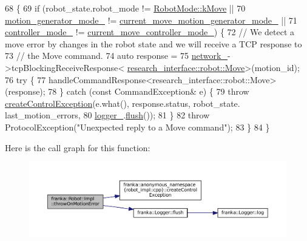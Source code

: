 \begin{DoxyCode}
68                                                                                     \{
69   \textcolor{keywordflow}{if} (robot\_state.robot\_mode != \hyperlink{namespacefranka_adfe059ae23ebbad59e421edaa879651aae54c7412401b5e36c1c254e6fb17a3dd}{RobotMode::kMove} ||
70       \hyperlink{classfranka_1_1Robot_1_1Impl_a209c353b4da1c85d3e633cab161a0d39}{motion\_generator\_mode\_} != 
      \hyperlink{classfranka_1_1Robot_1_1Impl_a2fecb29212c55738e284b2ba8249ad5c}{current\_move\_motion\_generator\_mode\_} ||
71       \hyperlink{classfranka_1_1Robot_1_1Impl_aa435885c35275fc60b8de90832ae24df}{controller\_mode\_} != \hyperlink{classfranka_1_1Robot_1_1Impl_ab5d1a7e855dae2453635da08440c375e}{current\_move\_controller\_mode\_}) \{
72     \textcolor{comment}{// We detect a move error by changes in the robot state and we will receive a TCP response to}
73     \textcolor{comment}{// the Move command.}
74     \textcolor{keyword}{auto} response =
75         \hyperlink{classfranka_1_1Robot_1_1Impl_acecf3b158ccd1c2ed7e76971f1e6a192}{network\_}->tcpBlockingReceiveResponse<
      \hyperlink{structresearch__interface_1_1robot_1_1Move}{research\_interface::robot::Move}>(motion\_id);
76     \textcolor{keywordflow}{try} \{
77       handleCommandResponse<research\_interface::robot::Move>(response);
78     \} \textcolor{keywordflow}{catch} (\textcolor{keyword}{const} CommandException& e) \{
79       \textcolor{keywordflow}{throw} \hyperlink{namespacefranka_1_1anonymous__namespace_02robot__impl_8cpp_03_ad774a35737682bade54336046f9d09b2}{createControlException}(e.what(), response.status, robot\_state.
      last\_motion\_errors,
80                                    \hyperlink{classfranka_1_1Robot_1_1Impl_a404078ee04a4786f61d991b71d2dc1ff}{logger\_}.\hyperlink{classfranka_1_1Logger_a44b15a95e25dabe93f797c1d9651fb6e}{flush}());
81     \}
82     \textcolor{keywordflow}{throw} ProtocolException(\textcolor{stringliteral}{"Unexpected reply to a Move command"});
83   \}
84 \}
\end{DoxyCode}
Here is the call graph for this function\+:
\nopagebreak
\begin{figure}[H]
\begin{center}
\leavevmode
\includegraphics[width=350pt]{classfranka_1_1Robot_1_1Impl_ace3373a95db9754ab9df732d9b1dd1f6_cgraph}
\end{center}
\end{figure}
\mbox{\label{classfranka_1_1Robot_1_1Impl_a961bcad42d2be61ff56b7004498fa8dd}} 
